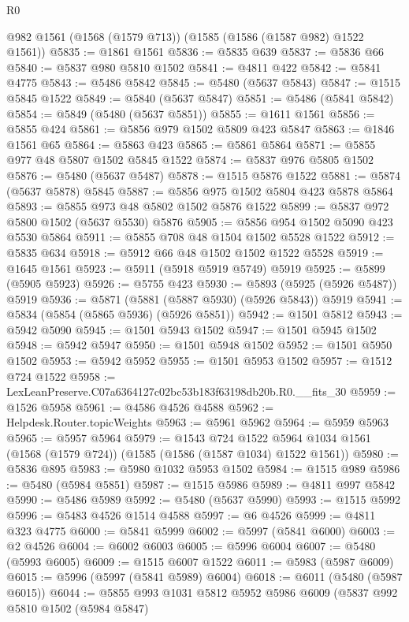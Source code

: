 \begin{lexlean}{R0}
\begin{coremodule}
    @982
    @1561
    (@1568 (@1579 @713))
    (@1585 (@1586 (@1587 @982) @1522 @1561))
@5835 := @1861 @1561
@5836 := @5835 @639
@5837 := @5836 @66
@5840 := @5837 @980 @5810 @1502
@5841 := @4811 @422
@5842 := @5841 @4775
@5843 := @5486 @5842
@5845 := @5480 (@5637 @5843)
@5847 := @1515 @5845 @1522
@5849 := @5840 (@5637 @5847)
@5851 := @5486 (@5841 @5842)
@5854 := @5849 (@5480 (@5637 @5851))
@5855 := @1611 @1561
@5856 := @5855 @424
@5861 := @5856 @979 @1502 @5809 @423 @5847
@5863 := @1846 @1561 @65
@5864 := @5863 @423
@5865 := @5861 @5864
@5871 := @5855 @977 @48 @5807 @1502 @5845 @1522
@5874 := @5837 @976 @5805 @1502
@5876 := @5480 (@5637 @5487)
@5878 := @1515 @5876 @1522
@5881 := @5874 (@5637 @5878) @5845
@5887 := @5856 @975 @1502 @5804 @423 @5878 @5864
@5893 := @5855 @973 @48 @5802 @1502 @5876 @1522
@5899 := @5837 @972 @5800 @1502 (@5637 @5530) @5876
@5905 := @5856 @954 @1502 @5090 @423 @5530 @5864
@5911 := @5855 @708 @48 @1504 @1502 @5528 @1522
@5912 := @5835 @634
@5918 := @5912 @66 @48 @1502 @1502 @1522 @5528
@5919 := @1645 @1561
@5923 := @5911 (@5918 @5919 @5749) @5919
@5925 := @5899 (@5905 @5923)
@5926 := @5755 @423
@5930 := @5893 (@5925 (@5926 @5487)) @5919
@5936 := @5871 (@5881 (@5887 @5930) (@5926 @5843)) @5919
@5941 := @5834 (@5854 (@5865 @5936) (@5926 @5851))
@5942 := @1501 @5812
@5943 := @5942 @5090
@5945 := @1501 @5943 @1502
@5947 := @1501 @5945 @1502
@5948 := @5942 @5947
@5950 := @1501 @5948 @1502
@5952 := @1501 @5950 @1502
@5953 := @5942 @5952
@5955 := @1501 @5953 @1502
@5957 := @1512 @724 @1522
@5958 := LexLeanPreserve.C07a6364127c02bc53b183f63198db20b.R0.__fits_30
@5959 := @1526 @5958
@5961 := @4586 @4526 @4588
@5962 := Helpdesk.Router.topicWeights
@5963 := @5961 @5962
@5964 := @5959 @5963
@5965 := @5957 @5964
@5979 := @1543
    @724
    @1522
    @5964
    @1034
    @1561
    (@1568 (@1579 @724))
    (@1585 (@1586 (@1587 @1034) @1522 @1561))
@5980 := @5836 @895
@5983 := @5980 @1032 @5953 @1502
@5984 := @1515 @989
@5986 := @5480 (@5984 @5851)
@5987 := @1515 @5986
@5989 := @4811 @997 @5842
@5990 := @5486 @5989
@5992 := @5480 (@5637 @5990)
@5993 := @1515 @5992
@5996 := @5483 @4526 @1514 @4588
@5997 := @6 @4526
@5999 := @4811 @323 @4775
@6000 := @5841 @5999
@6002 := @5997 (@5841 @6000)
@6003 := @2 @4526
@6004 := @6002 @6003
@6005 := @5996 @6004
@6007 := @5480 (@5993 @6005)
@6009 := @1515 @6007 @1522
@6011 := @5983 (@5987 @6009)
@6015 := @5996 (@5997 (@5841 @5989) @6004)
@6018 := @6011 (@5480 (@5987 @6015))
@6044 := @5855
    @993
    @1031
    @5812
    @5952
    @5986
    @6009
    (@5837
      @992
      @5810
      @1502
      (@5984 @5847)

\end{coremodule}
\end{lexlean}
